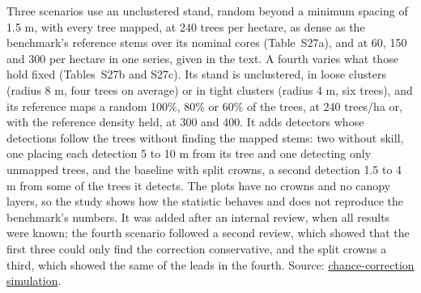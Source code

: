 \documentclass[10pt]{article}
\begin{document}
Three scenarios use an unclustered stand, random beyond a minimum spacing of 1.5
m, with every tree mapped, at 240 trees per hectare, as dense as the benchmark's
reference stems over its nominal cores (Table~S27a), and at 60, 150 and 300 per
hectare in one series, given in the text. A fourth varies what those hold fixed
(Tables~S27b and S27c). Its stand is unclustered, in loose clusters (radius 8 m,
four trees on average) or in tight clusters (radius 4 m, six trees), and its
reference maps a random 100\%, 80\% or 60\% of the trees, at 240 trees/ha or, with
the reference density held, at 300 and 400. It adds detectors whose detections
follow the trees without finding the mapped stems: two without skill, one
placing each detection 5 to 10 m from its tree and one detecting only unmapped
trees, and the baseline with split crowns, a second detection 1.5 to 4 m from
some of the trees it detects. The plots have no crowns and no canopy layers, so
the study shows how the statistic behaves and does not reproduce the benchmark's
numbers. It was added after an internal review, when all results were known; the
fourth scenario followed a second review, which showed that the first three
could only find the correction conservative, and the split crowns a third, which
showed the same of the leads in the fourth. Source: \href{https://github.com/devakellc/lidar-tree-benchmark/blob/main/results/chance-correction-simulation-results.md}{chance-correction
simulation}.
\end{document}
